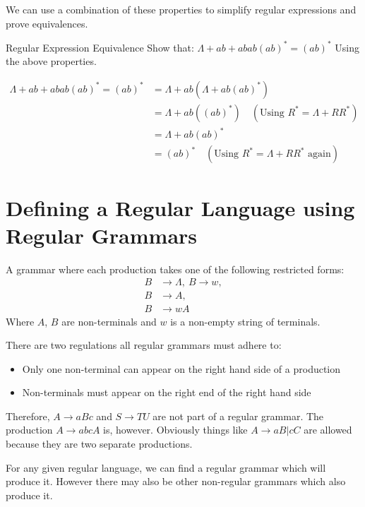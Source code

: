 We can use a combination of these properties to simplify regular expressions and prove equivalences.

\begin{example}{Regular Expression Equivalence}
Show that: $\Lambda + ab + abab(ab)^* = (ab)^*$ Using the above properties.

\begin{align*}
\Lambda + ab + abab(ab)^* = (ab)^* &= \Lambda + ab(\Lambda + ab(ab)^*)\\
&= \Lambda + ab((ab)^*) \quad  (\textrm{Using } R^* = \Lambda + RR^*)\\
&= \Lambda + ab(ab)^*\\
&= (ab)^* \quad  (\textrm{Using } R^* = \Lambda + RR^* \textrm{ again})
\end{align*}
\end{example}

\section{Defining a Regular Language using Regular Grammars}
\begin{define}
\item[Regular Grammar] A grammar where each production takes one of the following restricted forms:
\begin{align*}
B &\rightarrow \Lambda,\ B \rightarrow w,\\
B &\rightarrow A,\\
B &\rightarrow wA
\end{align*}
Where $A$, $B$ are non-terminals and $w$ is a non-empty string of terminals.
\end{define}

There are two regulations all regular grammars must adhere to:
\begin{itemize}
    \item Only one non-terminal can appear on the right hand side of a production
    \item Non-terminals must appear on the right end of the right hand side
\end{itemize}

Therefore, $A \rightarrow aBc$ and $S \rightarrow TU$ are not part of a regular grammar. The production $A \rightarrow abcA$ is, however. Obviously things like $A \rightarrow aB |cC$ are allowed because they are two separate productions.

For any given regular language, we can find a regular grammar which will produce it. However there may also be other non-regular grammars which also produce it. 

